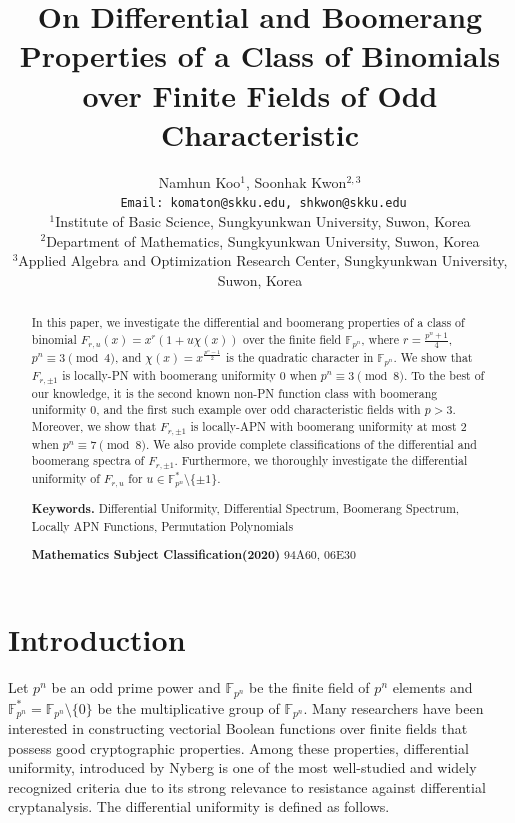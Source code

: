 \documentclass[11pt]{article}
\numberwithin{theorem}{section}
\newcommand{\Fpn}{\mathbb{F}_{p^n}}
\newcommand{\Fpnmul}{\mathbb{F}_{p^n}^*}
\begin{document}
	\title{On Differential and Boomerang Properties of a Class of Binomials over Finite Fields of Odd Characteristic}
	\author{ Namhun Koo$^1$, Soonhak Kwon$^{2,3}$\\
	\small{\texttt{ Email: komaton@skku.edu, shkwon@skku.edu}}\\
	\small{$^1$Institute of Basic Science, Sungkyunkwan University, Suwon, Korea}\\
	\small{$^2$Department of Mathematics, Sungkyunkwan University, Suwon, Korea}\\
	\small{$^3$Applied Algebra and Optimization Research Center, Sungkyunkwan University, Suwon, Korea}
	}
	\date{}
	
	\maketitle
	
	
\begin{abstract}
	In this paper, we investigate the differential and boomerang properties of a class of binomial $F_{r,u}(x) = x^r(1 + u\chi(x))$ over the finite field $\Fpn$, where $r = \frac{p^n+1}{4}$, $p^n \equiv 3 \pmod{4}$, and $\chi(x) = x^{\frac{p^n -1}{2}}$ is the quadratic character in $\Fpn$. We show that $F_{r,\pm1}$ is locally-PN with boomerang uniformity $0$ when $p^n \equiv 3 \pmod{8}$. To the best of our knowledge, it is the second known non-PN function class with boomerang uniformity $0$, and the first such example over odd characteristic fields with $p > 3$. Moreover, we show that $F_{r,\pm1}$ is locally-APN with boomerang uniformity at most $2$ when $p^n \equiv 7 \pmod{8}$. We also provide complete classifications of the differential and boomerang spectra of $F_{r,\pm1}$. Furthermore, we thoroughly investigate the differential uniformity of $F_{r,u}$ for $u\in \Fpnmul \setminus \{\pm1\}$.
	
	\bigskip
	\noindent \textbf{Keywords.} Differential Uniformity, Differential Spectrum, Boomerang Spectrum, Locally APN Functions, Permutation Polynomials
	
	\bigskip
	\noindent \textbf{Mathematics Subject Classification(2020)} 94A60, 06E30
\end{abstract}


\section{Introduction}

Let $p^n$ be an odd prime power and $\Fpn$ be the finite field of $p^n$ elements and $\Fpnmul=\Fpn\setminus \{0\}$ be the multiplicative group of $\Fpn$. Many researchers have been interested in constructing vectorial Boolean functions over finite fields that possess good cryptographic properties. Among these properties, differential uniformity, introduced by Nyberg \cite{Nyb94} is one of the most well-studied and widely recognized criteria due to its strong relevance to resistance against differential cryptanalysis. The differential uniformity is defined as follows.
\end{document}
